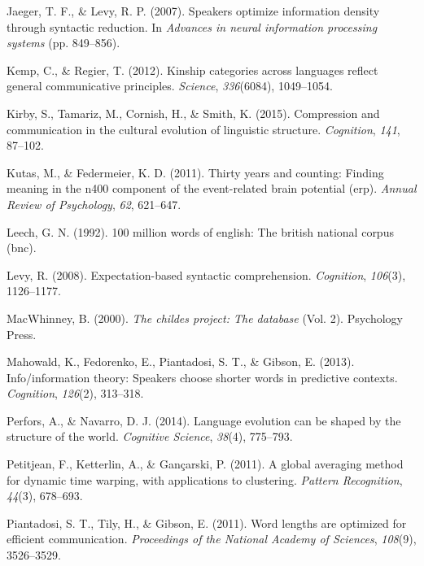 \documentclass[man,floatsintext]{apa6}
\begin{document}
\leavevmode\hypertarget{ref-jaeger2007}{}%
Jaeger, T. F., \& Levy, R. P. (2007). Speakers optimize information density through syntactic reduction. In \emph{Advances in neural information processing systems} (pp. 849--856).

\leavevmode\hypertarget{ref-kemp2012kinship}{}%
Kemp, C., \& Regier, T. (2012). Kinship categories across languages reflect general communicative principles. \emph{Science}, \emph{336}(6084), 1049--1054.

\leavevmode\hypertarget{ref-kirby2015compression}{}%
Kirby, S., Tamariz, M., Cornish, H., \& Smith, K. (2015). Compression and communication in the cultural evolution of linguistic structure. \emph{Cognition}, \emph{141}, 87--102.

\leavevmode\hypertarget{ref-kutas2011}{}%
Kutas, M., \& Federmeier, K. D. (2011). Thirty years and counting: Finding meaning in the n400 component of the event-related brain potential (erp). \emph{Annual Review of Psychology}, \emph{62}, 621--647.

\leavevmode\hypertarget{ref-leech1992}{}%
Leech, G. N. (1992). 100 million words of english: The british national corpus (bnc).

\leavevmode\hypertarget{ref-levy2008}{}%
Levy, R. (2008). Expectation-based syntactic comprehension. \emph{Cognition}, \emph{106}(3), 1126--1177.

\leavevmode\hypertarget{ref-macwhinney2000}{}%
MacWhinney, B. (2000). \emph{The childes project: The database} (Vol. 2). Psychology Press.

\leavevmode\hypertarget{ref-mahowald2013}{}%
Mahowald, K., Fedorenko, E., Piantadosi, S. T., \& Gibson, E. (2013). Info/information theory: Speakers choose shorter words in predictive contexts. \emph{Cognition}, \emph{126}(2), 313--318.

\leavevmode\hypertarget{ref-perfors2014language}{}%
Perfors, A., \& Navarro, D. J. (2014). Language evolution can be shaped by the structure of the world. \emph{Cognitive Science}, \emph{38}(4), 775--793.

\leavevmode\hypertarget{ref-petitjean2011}{}%
Petitjean, F., Ketterlin, A., \& Gançarski, P. (2011). A global averaging method for dynamic time warping, with applications to clustering. \emph{Pattern Recognition}, \emph{44}(3), 678--693.

\leavevmode\hypertarget{ref-piantadosi2011}{}%
Piantadosi, S. T., Tily, H., \& Gibson, E. (2011). Word lengths are optimized for efficient communication. \emph{Proceedings of the National Academy of Sciences}, \emph{108}(9), 3526--3529.
\end{document}
